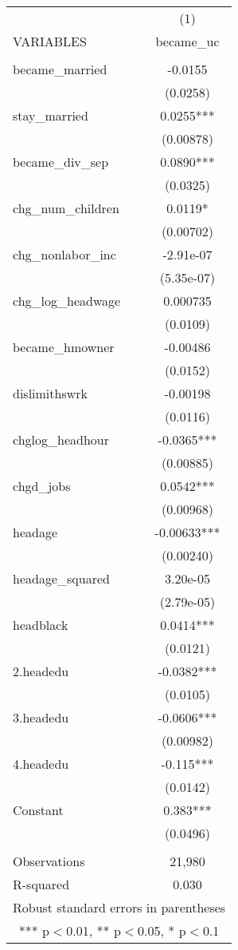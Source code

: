 \documentclass[]{article}
\begin{document}
\begin{tabular}{lc} \hline
 & (1) \\
VARIABLES & became\_uc \\ \hline
 &  \\
became\_married & -0.0155 \\
 & (0.0258) \\
stay\_married & 0.0255*** \\
 & (0.00878) \\
became\_div\_sep & 0.0890*** \\
 & (0.0325) \\
chg\_num\_children & 0.0119* \\
 & (0.00702) \\
chg\_nonlabor\_inc & -2.91e-07 \\
 & (5.35e-07) \\
chg\_log\_headwage & 0.000735 \\
 & (0.0109) \\
became\_hmowner & -0.00486 \\
 & (0.0152) \\
dislimithswrk & -0.00198 \\
 & (0.0116) \\
chglog\_headhour & -0.0365*** \\
 & (0.00885) \\
chgd\_jobs & 0.0542*** \\
 & (0.00968) \\
headage & -0.00633*** \\
 & (0.00240) \\
headage\_squared & 3.20e-05 \\
 & (2.79e-05) \\
headblack & 0.0414*** \\
 & (0.0121) \\
2.headedu & -0.0382*** \\
 & (0.0105) \\
3.headedu & -0.0606*** \\
 & (0.00982) \\
4.headedu & -0.115*** \\
 & (0.0142) \\
Constant & 0.383*** \\
 & (0.0496) \\
 &  \\
Observations & 21,980 \\
 R-squared & 0.030 \\ \hline
\multicolumn{2}{c}{ Robust standard errors in parentheses} \\
\multicolumn{2}{c}{ *** p$<$0.01, ** p$<$0.05, * p$<$0.1} \\
\end{tabular}
\end{document}
